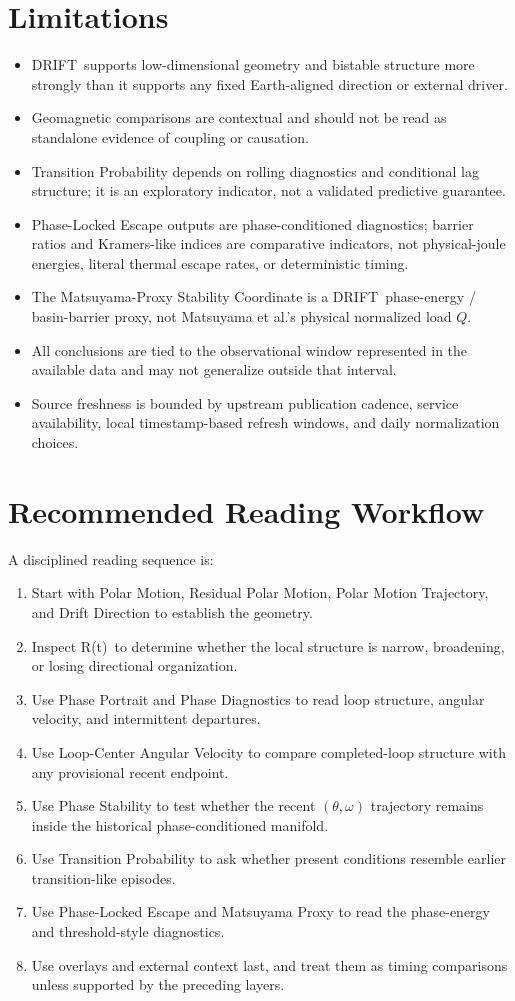 \documentclass[11pt]{article}
\newcommand{\DRIFT}{\textsc{DRIFT}}
\newcommand{\Rratio}{R(t)}
\begin{document}
\section{Limitations}
\begin{itemize}
\item \DRIFT\ supports low-dimensional geometry and bistable structure more strongly than it supports any fixed Earth-aligned direction or external driver.
\item Geomagnetic comparisons are contextual and should not be read as standalone evidence of coupling or causation.
\item Transition Probability depends on rolling diagnostics and conditional lag structure; it is an exploratory indicator, not a validated predictive guarantee.
\item Phase-Locked Escape outputs are phase-conditioned diagnostics; barrier ratios and Kramers-like indices are comparative indicators, not physical-joule energies, literal thermal escape rates, or deterministic timing.
\item The Matsuyama-Proxy Stability Coordinate is a \DRIFT\ phase-energy / basin-barrier proxy, not Matsuyama et al.'s physical normalized load \(Q\).
\item All conclusions are tied to the observational window represented in the available data and may not generalize outside that interval.
\item Source freshness is bounded by upstream publication cadence, service availability, local timestamp-based refresh windows, and daily normalization choices.
\end{itemize}

\section{Recommended Reading Workflow}
A disciplined reading sequence is:
\begin{enumerate}
\item Start with Polar Motion, Residual Polar Motion, Polar Motion Trajectory, and Drift Direction to establish the geometry.
\item Inspect \Rratio\ to determine whether the local structure is narrow, broadening, or losing directional organization.
\item Use Phase Portrait and Phase Diagnostics to read loop structure, angular velocity, and intermittent departures.
\item Use Loop-Center Angular Velocity to compare completed-loop structure with any provisional recent endpoint.
\item Use Phase Stability to test whether the recent \((\theta,\omega)\) trajectory remains inside the historical phase-conditioned manifold.
\item Use Transition Probability to ask whether present conditions resemble earlier transition-like episodes.
\item Use Phase-Locked Escape and Matsuyama Proxy to read the phase-energy and threshold-style diagnostics.
\item Use overlays and external context last, and treat them as timing comparisons unless supported by the preceding layers.
\end{enumerate}
\end{document}
